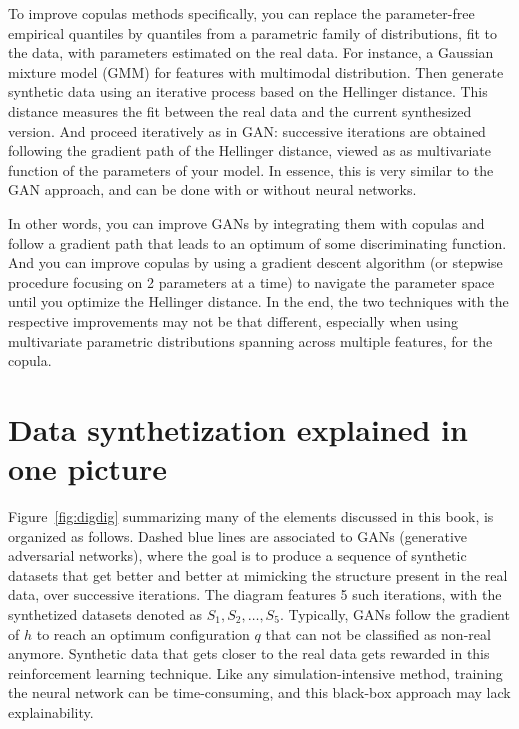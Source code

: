 \documentclass[oneside,10pt]{book}
\begin{document}
To improve copulas methods specifically, you can replace the
parameter-free \textcolor{index}{empirical quantiles} by quantiles from a parametric family of distributions, fit to the data, with parameters estimated on the real data. For instance, a \textcolor{index}{Gaussian mixture model} (GMM) for features with multimodal distribution. Then generate synthetic data using an iterative process
 based on the
 \textcolor{index}{Hellinger distance}. This distance measures the fit between the real data and the current synthesized version. And proceed iteratively as in GAN: successive iterations are obtained following the gradient path of the Hellinger distance, viewed as as multivariate function of the parameters of your model. In essence, this is very similar to the GAN approach, and can be done with or without neural networks.

In other words, you can improve GANs by integrating them with copulas and follow a gradient path that leads to an optimum of some discriminating function. And you can improve copulas by using a gradient descent algorithm (or stepwise procedure focusing on 2 parameters at a time) to navigate the parameter space until you optimize the Hellinger distance.
 In the end, the two techniques with the respective improvements may not be that different, especially when using multivariate parametric distributions spanning across multiple features, for the copula.


\section{Data synthetization explained in one picture}

Figure~\ref{fig:digdig} summarizing many of the elements discussed in this book, is organized as follows. Dashed blue lines are associated to GANs
(\textcolor{index}{generative adversarial networks}), where the goal is to produce a sequence of synthetic datasets that get better and better at mimicking the structure present in the real data, over successive iterations. The diagram features 5 such iterations, with the synthetized datasets denoted as $S_1,S_2,\dots,S_5$. Typically, GANs follow the gradient of $h$ to reach an optimum configuration $q$ that can not be classified as
non-real anymore. Synthetic data that gets closer to the real data gets rewarded in this
\textcolor{index}{reinforcement learning} technique. Like any
 simulation-intensive method, training the neural network can be time-consuming, and this black-box approach
 may lack \textcolor{index}{explainability}.
\end{document}

